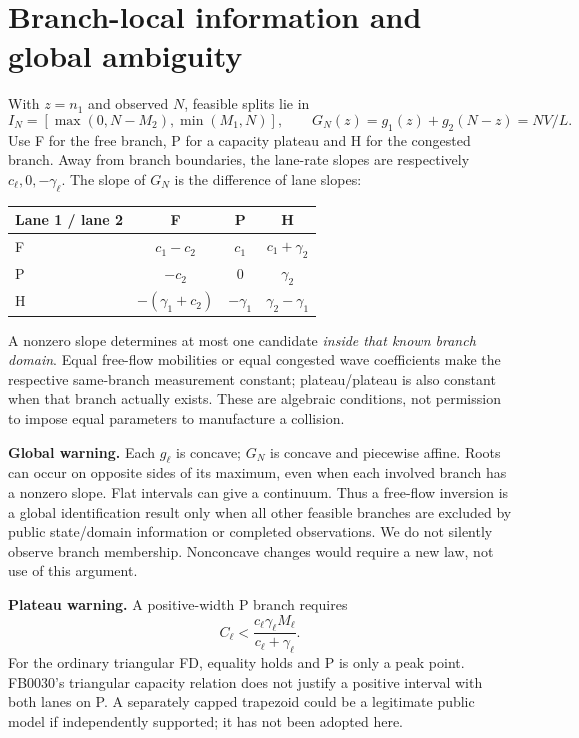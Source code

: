 \documentclass[10pt,a4paper]{article}
\begin{document}
\section{Branch-local information and global ambiguity}
With $z=n_1$ and observed $N$, feasible splits lie in
\begin{equation}
I_N=[\max(0,N-M_2),\min(M_1,N)],\qquad
G_N(z)=g_1(z)+g_2(N-z)=NV/L.
\end{equation}
Use F for the free branch, P for a capacity plateau and H for the congested
branch. Away from branch boundaries, the lane-rate slopes are respectively
$c_\ell,0,-\gamma_\ell$. The slope of $G_N$ is the difference of lane slopes:
\begin{center}
\begin{tabular}{lccc}\toprule
Lane 1 / lane 2 & F & P & H\\\midrule
F & $c_1-c_2$ & $c_1$ & $c_1+\gamma_2$\\
P & $-c_2$ & $0$ & $\gamma_2$\\
H & $-(\gamma_1+c_2)$ & $-\gamma_1$ & $\gamma_2-\gamma_1$\\
\bottomrule\end{tabular}
\end{center}
A nonzero slope determines at most one candidate \emph{inside that known
branch domain}. Equal free-flow mobilities or equal congested wave coefficients
make the respective same-branch measurement constant; plateau/plateau is also
constant when that branch actually exists. These are algebraic conditions,
not permission to impose equal parameters to manufacture a collision.

\textbf{Global warning.} Each $g_\ell$ is concave; $G_N$ is concave and
piecewise affine. Roots can occur on opposite sides of its maximum, even when
each involved branch has a nonzero slope. Flat intervals can give a continuum.
Thus a free-flow inversion is a global identification result only when all
other feasible branches are excluded by public state/domain information or
completed observations. We do not silently observe branch membership.
Nonconcave changes would require a new law, not use of this argument.

\textbf{Plateau warning.} A positive-width P branch requires
\begin{equation}
C_\ell<\frac{c_\ell\gamma_\ell M_\ell}{c_\ell+\gamma_\ell}.
\end{equation}
For the ordinary triangular FD, equality holds and P is only a peak point.
FB0030's triangular capacity relation does not justify a positive interval
with both lanes on P. A separately capped trapezoid could be a legitimate
public model if independently supported; it has not been adopted here.
\end{document}
